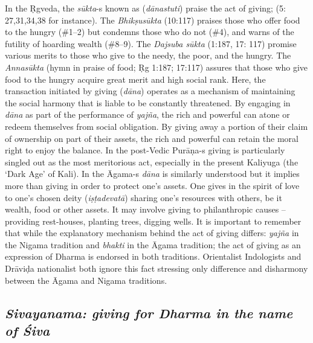 In the Ṛgveda, the \textit{sūkta}-s known as (\textit{dānastuti}) praise the act of giving; (5: 27,31,34,38 for instance). The \textit{Bhikṣusūkta} (10:117) praises those who offer food to the hungry (\#1–2) but condemns those who do not (\#4), and warns of the futility of hoarding wealth (\#8–9). The \textit{Dajsuba sūkta} (1:187, 17: 117) promise various merits to those who give to the needy, the poor, and the hungry. The \textit{Annasūkta} (hymn in praise of food; Ṛg 1:187; 17:117) assures that those who give food to the hungry acquire great merit and high social rank. Here, the transaction initiated by giving (\textit{dāna}) operates as a mechanism of maintaining the social harmony that is liable to be constantly threatened. By engaging in \textit{dāna} as part of the performance of \textit{yajña}, the rich and powerful can atone or redeem themselves from social obligation. By giving away a portion of their claim of ownership on part of their assets, the rich and powerful can retain the moral right to enjoy the balance. In the post-Vedic Purāṇa-s giving is particularly singled out as the most meritorious act, especially in the present Kaliyuga (the ‘Dark Age’ of Kali). In the Āgama-s \textit{dāna} is similarly understood but it implies more than giving in order to protect one’s assets. One gives in the spirit of love to one’s chosen deity (\textit{iṣṭadevatā}) sharing one’s resources with others, be it wealth, food or other assets. It may involve giving to philanthropic causes – providing rest-houses, planting trees, digging wells. It is important to remember that while the explanatory mechanism behind the act of giving differs: \textit{yajña} in the Nigama tradition and \textit{bhakti} in the Āgama tradition; the act of giving as an expression of Dharma is endorsed in both traditions. Orientalist Indologists and Drāviḍa nationalist both ignore this fact stressing only difference and disharmony between the Āgama and Nigama traditions.


\subsection*{\textit{Sivayanama: giving for Dharma in the name of Śiva}}

\vskip -7pt

